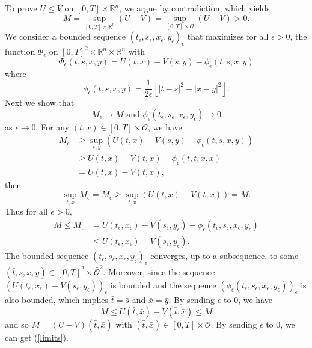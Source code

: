 \documentclass[12pt,a4paper]{ctexart}
\begin{document}
To prove $U \leq V$ on $[0, T] \times \mathbb{R}^{n}$, we argue by contradiction, which yields
\begin{equation} \label{contradiction}
    M = \sup_{[0, T] \times \mathbb{R}^{n}} (U - V) = \sup_{[0, T] \times \mathcal{O}} (U - V) > 0.
\end{equation}
We consider a bounded sequence $(t_\epsilon, s_\epsilon, x_\epsilon, y_\epsilon)_{\epsilon}$ that maximizes for all $\epsilon > 0$, the function $\Phi_{\epsilon}$ on $[0, T]^{2} \times \mathbb{R}^{n} \times \mathbb{R}^{n}$ with
\begin{equation}
    \Phi_{\epsilon} (t,s,x,y) = U(t,x) - V(s,y) - \phi_{\epsilon}(t,s,x,y)
\end{equation}
where
\begin{equation}
    \phi_{\epsilon} (t,s,x,y) = \frac{1}{2 \epsilon} [|t-s|^{2} + |x-y|^{2}].
\end{equation}
Next we show that 
\begin{equation} \label{limits}
    M_{\epsilon} \to M \,\, \text{and} \,\, \phi_{\epsilon}(t_\epsilon, s_\epsilon, x_\epsilon, y_\epsilon) \to 0
\end{equation}
as $\epsilon \to 0$. For any $(t,x) \in [0,T] \times \mathcal{O}$, we have
\begin{align*}
    M_{\epsilon} & \geq \sup_{s, y} (U(t,x) - V(s,y) - \phi_{\epsilon}(t,s,x,y)) \\
    & \geq U(t,x) - V(t,x) - \phi_{\epsilon}(t,t,x,x) \\
    & = U(t,x) - V(t,x),
\end{align*}
then 
\begin{equation*}
    \sup_{t,x} M_{\epsilon} = M_{\epsilon} \geq \sup_{t,x} (U(t,x) - V(t,x)) = M.
\end{equation*}
Thus for all $\epsilon > 0$,
\begin{align*}
    M \leq M_{\epsilon} & = U(t_\epsilon, x_\epsilon) - V(s_\epsilon, y_\epsilon) - \phi_{\epsilon}(t_\epsilon, s_\epsilon, x_\epsilon, y_\epsilon)  \\
    & \leq U(t_\epsilon, x_\epsilon) - V(s_\epsilon, y_\epsilon).
\end{align*}
The bounded sequence $(t_\epsilon, s_\epsilon, x_\epsilon, y_\epsilon)_{\epsilon}$ converges, up to a subsequence, to some $(\bar t, \bar s, \bar x, \bar y) \in [0, T]^{2} \times \bar{\mathcal{O}}^{2}$. Moreover, since the sequence $(U(t_\epsilon, x_\epsilon) - V(s_\epsilon, y_\epsilon))_\epsilon$ is bounded and the sequence $(\phi_{\epsilon}(t_\epsilon, s_\epsilon, x_\epsilon, y_\epsilon))_\epsilon$ is also bounded, which implies $\bar t = \bar s$ and $\bar x = \bar y$. By sending $\epsilon$ to $0$, we have
\begin{equation*}
    M \leq U(\bar t, \bar x) - V(\bar t, \bar x) \leq M
\end{equation*}
and so $ M = (U - V)(\bar t, \bar x)$ with $(\bar t, \bar x) \in [0, T] \times \mathcal{O}$. By sending $\epsilon$ to 0, we can get (\ref{limits}). 
\end{document}
